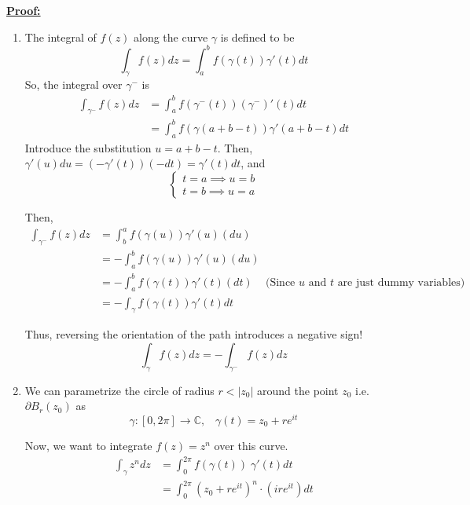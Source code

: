 \documentclass{article}
\newcommand{\C}{\mathbb{C}}
\begin{document}
\vskip 0.5cm
\underline{\textbf{Proof:}}

\begin{enumerate}[label=(\alph*)]
  \item The integral of $f(z)$ along the curve $\gamma$ is defined to be
  \[ \int_{\gamma} f(z)dz = \int_{a}^{b} f(\gamma(t)) \gamma'(t) dt \]
  So, the integral over $\gamma^{-}$ is 
  \begin{align*}
    \int_{\gamma^{-}} f(z) dz &= \int_{a}^{b} f(\gamma^{-}(t))(\gamma^{-})'(t) dt \\
    &= \int_{a}^{b} f(\gamma(a + b - t)) \gamma'(a + b - t) dt
  \end{align*}
  Introduce the substitution $u = a + b - t$. Then, $\gamma'(u)du = (-\gamma'(t))(-dt) = \gamma'(t) dt$,  and 
  \[   \begin{cases}
  t = a \implies u = b \\
  t = b \implies u = a
  \end{cases} \]

  Then, 
  \begin{align*}
    \int_{\gamma^{-}} f(z)dz &= \int_{b}^{a} f(\gamma(u)) \gamma'(u) (du) \\
    &= -\int_{a}^{b} f(\gamma(u)) \gamma'(u) (du) \\
    &= -\int_{a}^{b} f(\gamma(t)) \gamma'(t) (dt) \;\;\;\text{ (Since $u$ and $t$ are just dummy variables)} \\
    &= -\int_{\gamma} f(\gamma(t)) \gamma'(t) dt
  \end{align*}

  Thus, reversing the orientation of the path introduces a negative sign!
  \[ \boxed{ \int_{\gamma} f(z)dz = -\int_{\gamma^{-}} f(z)dz} \]

  \vskip 0.5cm
  \item We can parametrize the circle of radius $r < |z_0|$ around the point $z_0$ i.e. $\partial B_{r}(z_0)$ as 
  \[ \gamma : [0, 2\pi] \rightarrow \C,\;\;\; \gamma(t) = z_0 + re^{it} \]

  Now, we want to integrate $f(z) = z^n$ over this curve.
  \begin{align*}
    \int_{\gamma} z^n dz &= \int_{0}^{2\pi} f(\gamma(t)) \; \gamma'(t) dt \\
    &= \int_{0}^{2\pi} (z_0 + re^{it})^n \cdot (ire^{it}) dt \\
  \end{align*}


\end{enumerate}
\end{document}

